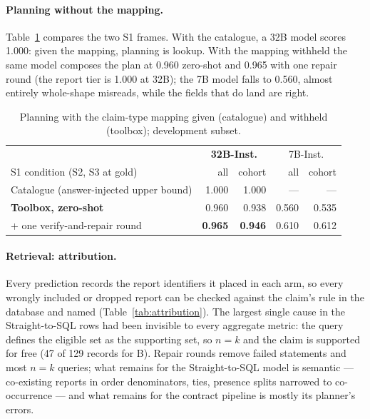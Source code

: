 \paragraph{Planning without the mapping.} Table~\ref{tab:toolbox} compares the
two S1 frames. With the catalogue, a 32B model scores 1.000: given the mapping,
planning is lookup. With the mapping withheld the same model composes the plan
at 0.960 zero-shot and 0.965 with one repair round (the report tier is 1.000
at 32B); the 7B model falls to 0.560, almost entirely whole-shape misreads,
while the fields that do land are right.

\begin{table}[t]
\centering
\small
\begin{tabular}{lrrrr}
\toprule
 & \multicolumn{2}{c}{\textbf{32B-Inst.}} & \multicolumn{2}{c}{7B-Inst.} \\
S1 condition (S2, S3 at gold) & all & cohort & all & cohort \\
\midrule
Catalogue (answer-injected upper bound) & 1.000 & 1.000 & --- & --- \\
\textbf{Toolbox, zero-shot} & 0.960 & 0.938 & 0.560 & 0.535 \\
\quad + one verify-and-repair round & \textbf{0.965} & \textbf{0.946} & 0.610 & 0.612 \\
\bottomrule
\end{tabular}
\caption{Planning with the claim-type mapping given (catalogue) and withheld
(toolbox); development subset.}
\label{tab:toolbox}
\end{table}

\paragraph{Retrieval: attribution.} Every prediction records the report
identifiers it placed in each arm, so every wrongly included or dropped report
can be checked against the claim's rule in the database and named
(Table~\ref{tab:attribution}). The largest single cause in the Straight-to-SQL rows
had been invisible to every aggregate metric: the query defines the eligible
set as the supporting set, so $n = k$ and the claim is supported for free (47 of 129 records for B). Repair rounds remove failed statements and most $n = k$
queries; what remains for the Straight-to-SQL model is semantic --- co-existing
reports in order denominators, ties, presence splits narrowed to co-occurrence
--- and what remains for the contract pipeline is mostly its planner's errors.

